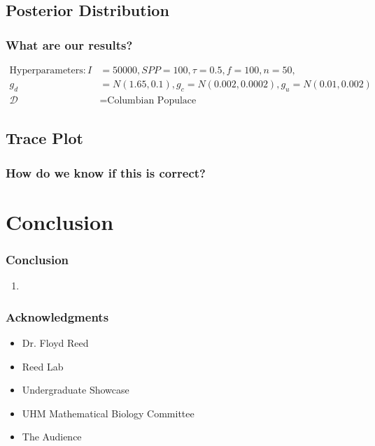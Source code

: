 \documentclass[11pt]{beamer}
\begin{document}
    \subsection{Posterior Distribution}\label{subsec:pd}
    \begin{frame}
        \frametitle{What are our results?}

        \scriptsize{
            \begin{align*}
                \text{Hyperparameters}: \mathit{I} &= 50000, \mathit{SPP} = 100, \tau = 0.5, f = 100, n = 50, \\
                g_d &= N(1.65, 0.1), g_c = N(0.002, 0.0002), g_u = N(0.01, 0.002) \\
                \mathcal{D} &= \text{Columbian Populace}
            \end{align*}
        }

        \note{
            \footnotesize
            \begin{enumerate}
                \item
            \end{enumerate}
        }
    \end{frame}

    \subsection{Trace Plot}\label{subsec:tp}
    \begin{frame}
        \frametitle{How do we know if this is correct?}

        \note{
            \footnotesize
            \begin{enumerate}
                \item
            \end{enumerate}
        }
    \end{frame}

    \section{Conclusion}\label{sec:c}
    \begin{frame}
        \frametitle{Conclusion}

        \begin{enumerate}
            \item
        \end{enumerate}
    \end{frame}

    \begin{frame}
        \frametitle{Acknowledgments}
        \begin{itemize}
            \item Dr. Floyd Reed \bigskip
            \item Reed Lab \bigskip
            \item Undergraduate Showcase \bigskip
            \item UHM Mathematical Biology Committee \bigskip
            \item The Audience
        \end{itemize}
    \end{frame}
\end{document}
